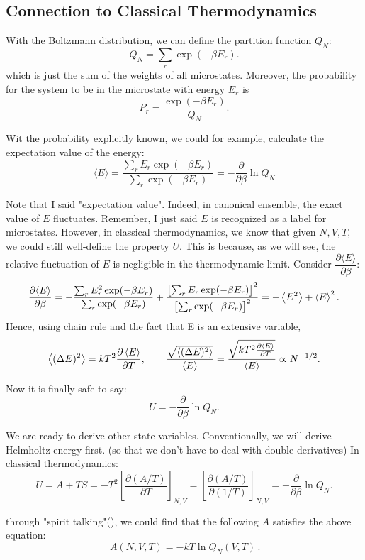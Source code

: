 \subsection{Connection to Classical Thermodynamics}
With the Boltzmann distribution, we can define the partition function $Q_N$: 
\[
    Q_N = \sum_r \exp(-\beta E_r).
\]
which is just the sum of the weights of all microstates. Moreover, the probability for the system to be in the microstate with energy $E_r$ is
\[
    P_r = \frac{\exp(-\beta E_r)}{Q_N}.
\]

Wit the probability explicitly known, we could for example, calculate the expectation value of the energy:
\[
    \langle E \rangle = \frac{\sum_r E_r\exp(-\beta E_r)}{\sum_r \exp(-\beta E_r)}
    = -\frac{\partial}{\partial\beta}\ln Q_N
\]

Note that I said "expectation value". Indeed, in canonical ensemble, the exact value of $E$ fluctuates. 
Remember, I just said $E$ is recognized as a label for microstates. 
However, in classical thermodynamics, we know that given $N, V, T$, we could still well-define the property $U$. 
This is because, as we will see, the relative fluctuation of $E$ is negligible in the thermodynamic limit. 
Consider $\dfrac{\partial \langle E \rangle}{\partial\beta}$:
\[
    \frac{\partial \langle E \rangle}{\partial\beta}
    = -\frac{\sum_r E_r^{2}\exp(-\beta E_r)}{\sum_r \exp(-\beta E_r)}
    + \frac{\bigl[\sum_r E_r\exp(-\beta E_r)\bigr]^{2}}{\bigl[\sum_r\exp(-\beta E_r)\bigr]^{2}}
    = -\left\langle E^{2} \right\rangle + \left\langle E \right\rangle^{2}.
\]
Hence, using chain rule and the fact that E is an extensive variable, 
\[
    \left\langle (\Delta E)^{2} \right\rangle = kT^{2} \frac{\partial \left\langle E \right\rangle}{\partial T} ,\qquad
    \frac{\sqrt{\left\langle (\Delta E)^{2} \right\rangle}}{\left\langle E \right\rangle} = \frac{\sqrt{kT^{2} \frac{\partial \left\langle E \right\rangle}{\partial T}}}{\left\langle E \right\rangle} \propto N^{-1/2}.
\]

Now it is finally safe to say: 
\[
    U = -\frac{\partial}{\partial\beta}\ln Q_N.
\]

We are ready to derive other state variables. Conventionally, we will derive Helmholtz energy first.
(so that we don't have to deal with double derivatives) In classical thermodynamics:
\[
    U = A + TS = -T^{2}\!\left[\frac{\partial(A/T)}{\partial T}\right]_{N,V}
    = \left[\frac{\partial(A/T)}{\partial(1/T)}\right]_{N,V} = -\frac{\partial}{\partial\beta}\ln Q_N.
\]

through "spirit talking"(), we could find that the following $A$ satisfies the above equation:
\[
    \boxed{\,A(N,V,T) = -kT\ln Q_N(V,T)\,}.
\]

